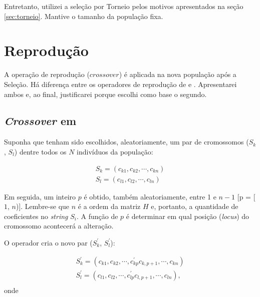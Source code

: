 			Entretanto, utilizei a seleção por Torneio pelos motivos apresentados na seção \ref{sec:torneio}. Mantive o tamanho da população fixa.
									
\section{Reprodução}

	A operação de reprodução ($crossover$) é aplicada na nova população após a Seleção. Há diferença entre os operadores de reprodução de \cite{metodo2004} e \cite{metodo2011}. Apresentarei ambos e, ao final, justificarei porque escolhi como base o segundo.

\subsection{\emph{Crossover} em \cite{metodo2004}}
	
	Suponha que tenham sido escolhidos, aleatoriamente, um par de cromossomos ($S_k$, $S_l$) dentre todos os $N$ indivíduos da população:
	
	\begin{equation}
		\begin{array}{l}
			S_k = (c_{k1}, c_{k2}, \cdots, c_{kn})	\\
			S_l = (c_{l1}, c_{l2}, \cdots, c_{ln})	
		\end{array}
	\end{equation}

	Em seguida, um inteiro $p$ é obtido, também aleatoriamente, entre 1 e $n - 1$ [p = [$1$, $n$)]. Lembre-se que $n$ é a ordem da matriz $H$ e, portanto, a quantidade de coeficientes no \emph{string} $S_i$. A função de $p$ é determinar em qual posição (\emph{locus}) do cromossomo acontecerá a alteração.
	
	O operador cria o novo par ($S^{'}_k$, $S^{'}_l$):
	
	\begin{equation}
		\begin{array}{l}
			S^{'}_k = (c_{k1}, c_{k2}, \cdots, c^{'}_{kp} c_{k,p+1}, \cdots, c_{kn})	\\
			S^{'}_l = (c_{l1}, c_{l2}, \cdots,  c^{'}_{lp} c_{l,p+1}, \cdots, c_{ln}),	\\
			
		\end{array}
	\end{equation}
	onde
	
